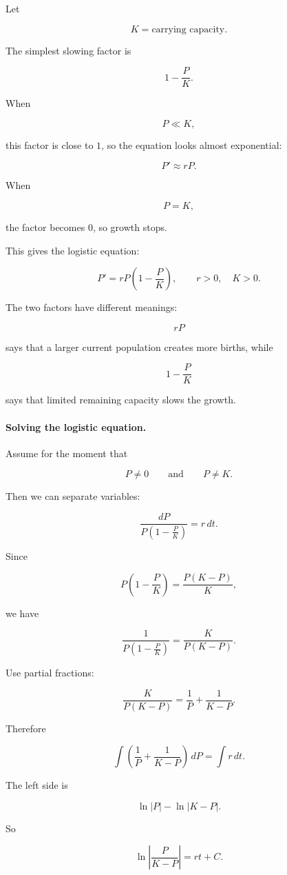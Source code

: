 Let

\[
K=\text{carrying capacity}.
\]

The simplest slowing factor is

\[
1-\frac{P}{K}.
\]

When

\[
P\ll K,
\]

this factor is close to \(1\), so the equation looks almost exponential:

\[
P'\approx rP.
\]

When

\[
P=K,
\]

the factor becomes \(0\), so growth stops.

This gives the logistic equation:

\[
\boxed{
P'=rP\left(1-\frac{P}{K}\right),
\qquad r>0,\quad K>0.
}
\]

The two factors have different meanings:

\[
rP
\]

says that a larger current population creates more births, while

\[
1-\frac{P}{K}
\]

says that limited remaining capacity slows the growth.

\paragraph{Solving the logistic equation.}
Assume for the moment that

\[
P\neq0
\qquad\text{and}\qquad
P\neq K.
\]

Then we can separate variables:

\[
\frac{dP}{P\left(1-\frac{P}{K}\right)}=r\,dt.
\]

Since

\[
P\left(1-\frac{P}{K}\right)=\frac{P(K-P)}{K},
\]

we have

\[
\frac{1}{P\left(1-\frac{P}{K}\right)}
=
\frac{K}{P(K-P)}.
\]

Use partial fractions:

\[
\frac{K}{P(K-P)}
=
\frac1P+\frac1{K-P}.
\]

Therefore

\[
\int\left(\frac1P+\frac1{K-P}\right)\,dP
=
\int r\,dt.
\]

The left side is

\[
\ln|P|-\ln|K-P|.
\]

So

\[
\ln\left|\frac{P}{K-P}\right|=rt+C.
\]

